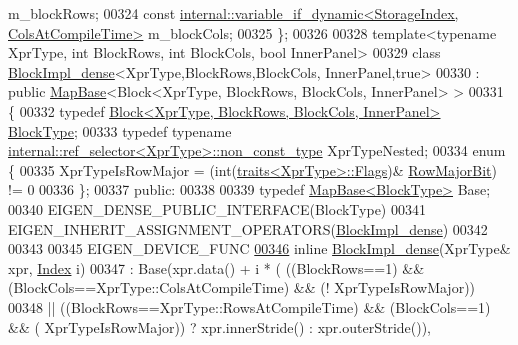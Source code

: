 \begin{DoxyCode}
       m\_blockRows;
00324     \textcolor{keyword}{const} \hyperlink{class_eigen_1_1internal_1_1variable__if__dynamic}{internal::variable\_if\_dynamic<StorageIndex, ColsAtCompileTime>}
       m\_blockCols;
00325 \};
00326 
00328 \textcolor{keyword}{template}<\textcolor{keyword}{typename} XprType, \textcolor{keywordtype}{int} BlockRows, \textcolor{keywordtype}{int} BlockCols, \textcolor{keywordtype}{bool} InnerPanel>
00329 \textcolor{keyword}{class }\hyperlink{class_eigen_1_1internal_1_1_block_impl__dense}{BlockImpl\_dense}<XprType,BlockRows,BlockCols, InnerPanel,true>
00330   : \textcolor{keyword}{public} \hyperlink{class_eigen_1_1_map_base}{MapBase}<Block<XprType, BlockRows, BlockCols, InnerPanel> >
00331 \{
00332     \textcolor{keyword}{typedef} \hyperlink{group___core___module_class_eigen_1_1_block}{Block<XprType, BlockRows, BlockCols, InnerPanel>}
       \hyperlink{group___core___module_class_eigen_1_1_block}{BlockType};
00333     \textcolor{keyword}{typedef} \textcolor{keyword}{typename} \hyperlink{class_eigen_1_1internal_1_1_tensor_lazy_evaluator_writable}{internal::ref\_selector<XprType>::non\_const\_type}
       XprTypeNested;
00334     \textcolor{keyword}{enum} \{
00335       XprTypeIsRowMajor = (int(\hyperlink{struct_eigen_1_1internal_1_1traits}{traits<XprType>::Flags})&
      \hyperlink{group__flags_gae4f56c2a60bbe4bd2e44c5b19cbe8762}{RowMajorBit}) != 0
00336     \};
00337   \textcolor{keyword}{public}:
00338 
00339     \textcolor{keyword}{typedef} \hyperlink{class_eigen_1_1_map_base}{MapBase<BlockType>} Base;
00340     EIGEN\_DENSE\_PUBLIC\_INTERFACE(BlockType)
00341     EIGEN\_INHERIT\_ASSIGNMENT\_OPERATORS(\hyperlink{class_eigen_1_1internal_1_1_block_impl__dense}{BlockImpl\_dense})
00342 
00343     
00345     EIGEN\_DEVICE\_FUNC
\hyperlink{class_eigen_1_1internal_1_1_block_impl__dense_3_01_xpr_type_00_01_block_rows_00_01_block_cols_00_01_inner_panel_00_01true_01_4_a72b340bbcd3acefc375e7a5eacd790f5}{00346}     \textcolor{keyword}{inline} \hyperlink{class_eigen_1_1internal_1_1_block_impl__dense_3_01_xpr_type_00_01_block_rows_00_01_block_cols_00_01_inner_panel_00_01true_01_4_a72b340bbcd3acefc375e7a5eacd790f5}{BlockImpl\_dense}(XprType& xpr, \hyperlink{namespace_eigen_a62e77e0933482dafde8fe197d9a2cfde}{Index} i)
00347       : Base(xpr.data() + i * (    ((BlockRows==1) && (BlockCols==XprType::ColsAtCompileTime) && (!
      XprTypeIsRowMajor)) 
00348                                 || ((BlockRows==XprType::RowsAtCompileTime) && (BlockCols==1) && ( 
      XprTypeIsRowMajor)) ? xpr.innerStride() : xpr.outerStride()),

\end{DoxyCode}
